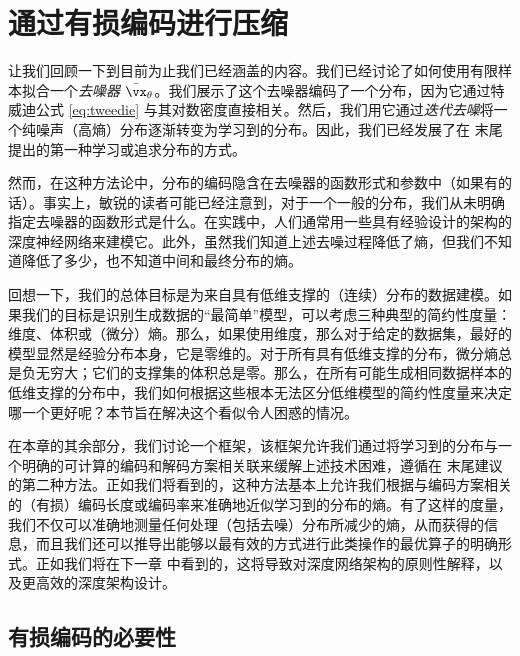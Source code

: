 \documentclass[../../book-main_zh.tex]{subfiles}
\begin{document}
\section{通过有损编码进行压缩} \label{sec:lossy_compression}

让我们回顾一下到目前为止我们已经涵盖的内容。我们已经讨论了如何使用有限样本拟合一个\textit{去噪器} \(\bar{\vx}_{\theta}\)。我们展示了这个去噪器编码了一个分布，因为它通过特威迪公式 \eqref{eq:tweedie} 与其对数密度直接相关。然后，我们用它通过\textit{迭代去噪}将一个纯噪声（高熵）分布逐渐转变为学习到的分布。因此，我们已经发展了在  末尾提出的第一种学习或追求分布的方式。

然而，在这种方法论中，分布的编码隐含在去噪器的函数形式和参数中（如果有的话）。事实上，敏锐的读者可能已经注意到，对于一个一般的分布，我们从未明确指定去噪器的函数形式是什么。在实践中，人们通常用一些具有经验设计的架构的深度神经网络来建模它。此外，虽然我们知道上述去噪过程降低了熵，但我们不知道降低了多少，也不知道中间和最终分布的熵。

回想一下，我们的总体目标是为来自具有低维支撑的（连续）分布的数据建模。如果我们的目标是识别生成数据的“最简单”模型，可以考虑三种典型的简约性度量：维度、体积或（微分）熵。那么，如果使用维度，那么对于给定的数据集，最好的模型显然是经验分布本身，它是零维的。对于所有具有低维支撑的分布，微分熵总是负无穷大；它们的支撑集的体积总是零。那么，在所有可能生成相同数据样本的低维支撑的分布中，我们如何根据这些根本无法区分低维模型的简约性度量来决定哪一个更好呢？本节旨在解决这个看似令人困惑的情况。

在本章的其余部分，我们讨论一个框架，该框架允许我们通过将学习到的分布与一个明确的可计算的编码和解码方案相关联来缓解上述技术困难，遵循在  末尾建议的第二种方法。正如我们将看到的，这种方法基本上允许我们根据与编码方案相关的（有损）编码长度或编码率来准确地近似学习到的分布的熵。有了这样的度量，我们不仅可以准确地测量任何处理（包括去噪）分布所减少的熵，从而获得的信息，而且我们还可以推导出能够以最有效的方式进行此类操作的最优算子的明确形式。正如我们将在下一章  中看到的，这将导致对深度网络架构的原则性解释，以及更高效的深度架构设计。

\subsection{有损编码的必要性}


\end{document}
